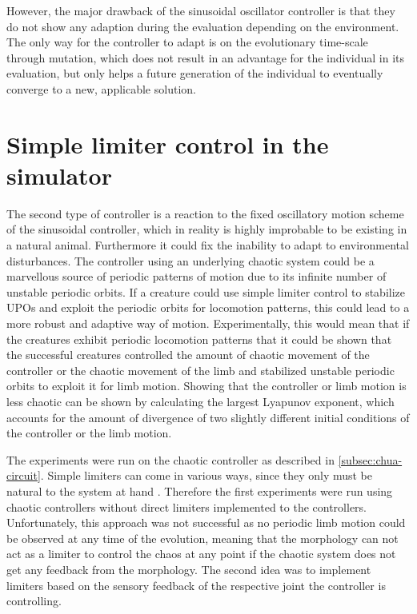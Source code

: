 \documentclass[main]{subfiles}
\begin{document}
However, the major drawback of the sinusoidal oscillator controller is that they do not show any adaption during the evaluation depending on the environment. The only way for the controller to adapt is on the evolutionary time-scale through mutation, which does not result in an advantage for the individual in its evaluation, but only helps a future generation of the individual to eventually converge to a new, applicable solution.

\section{Simple limiter control in the simulator}

The second type of controller is a reaction to the fixed oscillatory motion scheme of the sinusoidal controller, which in reality is highly improbable to be existing in a natural animal. Furthermore it could fix the inability to adapt to environmental disturbances. The controller using an underlying chaotic system could be a marvellous source of periodic patterns of motion due to its infinite number of unstable periodic orbits. If a creature could use simple limiter control to stabilize UPOs and exploit the periodic orbits for locomotion patterns, this could lead to a more robust and adaptive way of motion. Experimentally, this would mean that if the creatures exhibit periodic locomotion patterns that it could be shown that the successful creatures controlled the amount of chaotic movement of the controller or the chaotic movement of the limb and stabilized unstable periodic orbits to exploit it for limb motion. Showing that the controller or limb motion is less chaotic can be shown by calculating the largest Lyapunov exponent, which accounts for the amount of divergence of two slightly different initial conditions of the controller or the limb motion.

The experiments were run on the chaotic controller as described in \ref{subsec:chua-circuit}. Simple limiters can come in various ways, since they only must be natural to the system at hand \cite{bib:Corron2000}. Therefore the first experiments were run using chaotic controllers without direct limiters implemented to the controllers. Unfortunately, this approach was not successful as no periodic limb motion could be observed at any time of the evolution, meaning that the morphology can not act as a limiter to control the chaos at any point if the chaotic system does not get any feedback from the morphology. The second idea was to implement limiters based on the sensory feedback of the respective joint the controller is controlling.
\end{document}
